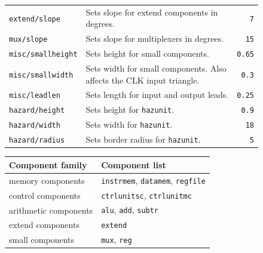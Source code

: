 \documentclass[10pt,a4paper]{scrartcl}
\begin{document}
\begin{figure}[htbp]
\begin{tabularx}{\textwidth}{|lXr|}
		\texttt{extend/slope}     & Sets slope for extend components in degrees.                          & \texttt{7}       \\
		\texttt{mux/slope}        & Sets slope for multiplexers in degrees.                               & \texttt{15}      \\
		\texttt{misc/smallheight} & Sets height for small components.                                     & \texttt{0.65}    \\
		\texttt{misc/smallwidth}  & Sets width for small components. Also affects the CLK input triangle. & \texttt{0.3}     \\
		\texttt{misc/leadlen}     & Sets length for input and output leads.                               & \texttt{0.25}    \\
		\texttt{hazard/height}    & Sets height for \texttt{hazunit}.                                     & \texttt{0.9}     \\
		\texttt{hazard/width}     & Sets width for  \texttt{hazunit}.                                     & \texttt{18}      \\
		\texttt{hazard/radius}    & Sets border radius for \texttt{hazunit}.                              & \texttt{5}       \\
		\hline
	\end{tabularx}
	\label{tab:keys}
\end{figure}

\begin{figure}[htbp]
	\begin{tabularx}{\textwidth}{|lX|}
		\hline
		Component family      & Component list                                        \\
		\hline
		memory components     & \texttt{instrmem}, \texttt{datamem}, \texttt{regfile} \\
		control components    & \texttt{ctrlunitsc}, \texttt{ctrlunitmc}              \\
		arithmetic components & \texttt{alu}, \texttt{add}, \texttt{subtr}            \\
		extend components     & \texttt{extend}                                       \\
		small components      & \texttt{mux}, \texttt{reg}                            \\
		\hline
	\end{tabularx}
	\label{tab:families}
\end{figure}
\end{document}
